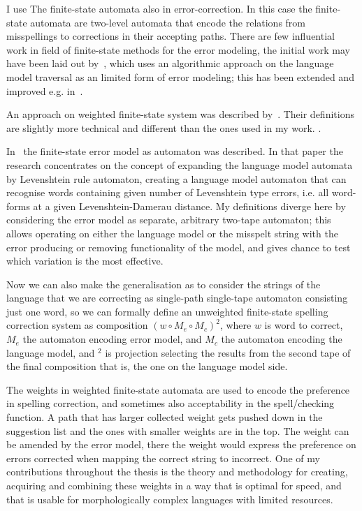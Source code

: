 \documentclass[officiallayout]{unihelcompling}
\begin{document}
I use The finite-state automata also in error-correction. In this case the
finite-state automata are two-level automata that encode the relations from
misspellings to corrections in their accepting paths. There are few influential
work in field of finite-state methods for the error modeling, the initial work
may have been laid out by~\citet{oflazer1996errortolerant}, which uses an
algorithmic approach on the language model traversal as an limited form of
error modeling; this has been extended and improved e.g. 
in~\citet{hulden2009fast}. 

An approach on weighted finite-state system was described
by~\citet{mohri2003edit}. Their definitions are slightly more technical and
different than the ones used in my work. .

In~\citet{agata2002typographical} the finite-state error model as automaton was
described. In that paper the research concentrates on the concept of expanding
the language model automata by Levenshtein rule automaton, creating a language
model automaton that can recognise words containing given number of Levenshtein
type errors, i.e. all word-forms at a given Levenshtein-Damerau distance. My
definitions diverge here by considering the error model as separate, arbitrary
two-tape automaton; this allows operating on either the language model or the
misspelt string with the error producing or removing functionality of the
model, and gives chance to test which variation is the most effective. 

Now we can also make the generalisation as to consider the strings of the
language that we are correcting as single-path single-tape automaton consisting
just one word, so we can formally define an unweighted finite-state spelling
correction system as composition $(w \circ M_e \circ M_c)^2$, where $w$ is word
to correct, $M_e$ the automaton encoding error model, and $M_c$ the automaton
encoding the language model, and $^2$ is projection selecting the results from
the second tape of the final composition that is, the one on the language
model side.

The weights in weighted finite-state automata are used to encode the preference
in spelling correction, and sometimes also acceptability in the spell\-/checking
function. A path that has larger collected weight gets pushed down in the
suggestion list and the ones with smaller weights are in the top. The weight
can be amended by the error model, there the weight would express the
preference on errors corrected when mapping the correct string to incorrect.
One of my contributions throughout the thesis is the
theory and methodology for creating, acquiring and combining these weights in a
way that is optimal for speed, and that is usable for morphologically complex
languages with limited resources.
\end{document}
